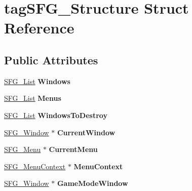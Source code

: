 \hypertarget{structtag_s_f_g___structure}{}\section{tag\+S\+F\+G\+\_\+\+Structure Struct Reference}
\label{structtag_s_f_g___structure}
\subsection*{Public Attributes}
\begin{DoxyCompactItemize}
\item 
\hyperlink{structtag_s_f_g___list}{S\+F\+G\+\_\+\+List} {\bfseries Windows}\hypertarget{structtag_s_f_g___structure_a9ce7ad887ddced3f4041855f0ee59e31}{}\label{structtag_s_f_g___structure_a9ce7ad887ddced3f4041855f0ee59e31}

\item 
\hyperlink{structtag_s_f_g___list}{S\+F\+G\+\_\+\+List} {\bfseries Menus}\hypertarget{structtag_s_f_g___structure_a7627e41fb13a98233dee296089d3cabd}{}\label{structtag_s_f_g___structure_a7627e41fb13a98233dee296089d3cabd}

\item 
\hyperlink{structtag_s_f_g___list}{S\+F\+G\+\_\+\+List} {\bfseries Windows\+To\+Destroy}\hypertarget{structtag_s_f_g___structure_afdbf8d1236b91cdd06fbd14eabd65143}{}\label{structtag_s_f_g___structure_afdbf8d1236b91cdd06fbd14eabd65143}

\item 
\hyperlink{structtag_s_f_g___window}{S\+F\+G\+\_\+\+Window} $\ast$ {\bfseries Current\+Window}\hypertarget{structtag_s_f_g___structure_ab3d72742bdf10e75c276a6f8ff53fe1a}{}\label{structtag_s_f_g___structure_ab3d72742bdf10e75c276a6f8ff53fe1a}

\item 
\hyperlink{structtag_s_f_g___menu}{S\+F\+G\+\_\+\+Menu} $\ast$ {\bfseries Current\+Menu}\hypertarget{structtag_s_f_g___structure_aa7ecdd0b0550b0366344228b0f8b2f31}{}\label{structtag_s_f_g___structure_aa7ecdd0b0550b0366344228b0f8b2f31}

\item 
\hyperlink{structtag_s_f_g___menu_context}{S\+F\+G\+\_\+\+Menu\+Context} $\ast$ {\bfseries Menu\+Context}\hypertarget{structtag_s_f_g___structure_ae6b830e12a1151c3d1f675b9eff2c1b5}{}\label{structtag_s_f_g___structure_ae6b830e12a1151c3d1f675b9eff2c1b5}

\item 
\hyperlink{structtag_s_f_g___window}{S\+F\+G\+\_\+\+Window} $\ast$ {\bfseries Game\+Mode\+Window}\hypertarget{structtag_s_f_g___structure_a130660eb385235ca2f9567d58dd72714}{}\label{structtag_s_f_g___structure_a130660eb385235ca2f9567d58dd72714}


\end{DoxyCompactItemize}

